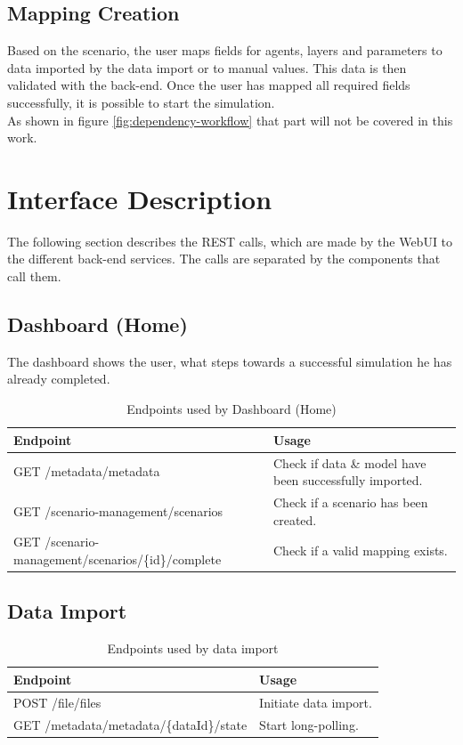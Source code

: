 \subsection{Mapping Creation}
Based on the scenario, the user maps fields for agents, layers and parameters to data imported by the data import or to manual values. This data is then validated with the back-end. Once the user has mapped all required fields successfully, it is possible to start the simulation.\\
As shown in figure \ref{fig:dependency-workflow} that part will not be covered in this work.



\section{Interface Description}
The following section describes the REST calls, which are made by the WebUI to the different back-end services. The calls are separated by the components that call them.


\subsection{Dashboard (Home)}
The dashboard shows the user, what steps towards a successful simulation he has already completed.
\begin{table}[H]
	\caption{Endpoints used by Dashboard (Home)}
	\begin{tabularx}{\textwidth}{|l|X|}
		\hline
		\textbf{Endpoint} & \textbf{Usage} \\ \hline
		GET /metadata/metadata & Check if data \& model have been successfully imported. \\ \hline
		GET /scenario-management/scenarios & Check if a scenario has been created.\\ \hline
		GET /scenario-management/scenarios/\{id\}/complete & Check if a valid mapping exists.\\ \hline
	\end{tabularx}
\end{table}


\subsection{Data Import}
\begin{table}[H]
	\caption{Endpoints used by data import}
	\begin{tabularx}{\textwidth}{|l|X|}
		\hline
		\textbf{Endpoint} & \textbf{Usage} \\ \hline
		POST /file/files & Initiate data import.\\ \hline
		GET /metadata/metadata/\{dataId\}/state & Start long-polling. \\ \hline
	\end{tabularx}
\end{table}


